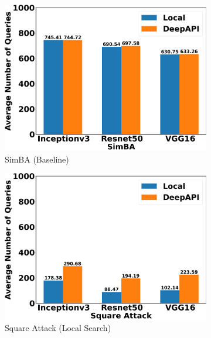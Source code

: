 \begin{figure}[tbp]
\centering
\begin{subfigure}[b]{0.6\textwidth}
    \centering
    \includegraphics[width=\textwidth]{figures/chapter_classification/simba_number_of_queries.png}
    \caption{SimBA (Baseline)}
    \label{fig:simba_queries}
\end{subfigure}
\hfill
\begin{subfigure}[b]{0.6\textwidth}
    \centering
    \includegraphics[width=\textwidth]{figures/chapter_classification/square_number_of_queries.png}
    \caption{Square Attack (Local Search)}
    \label{fig:square_queries}
\end{subfigure}
\hfill
\begin{subfigure}[b]{0.6\textwidth}

\end{subfigure}
\end{figure}
